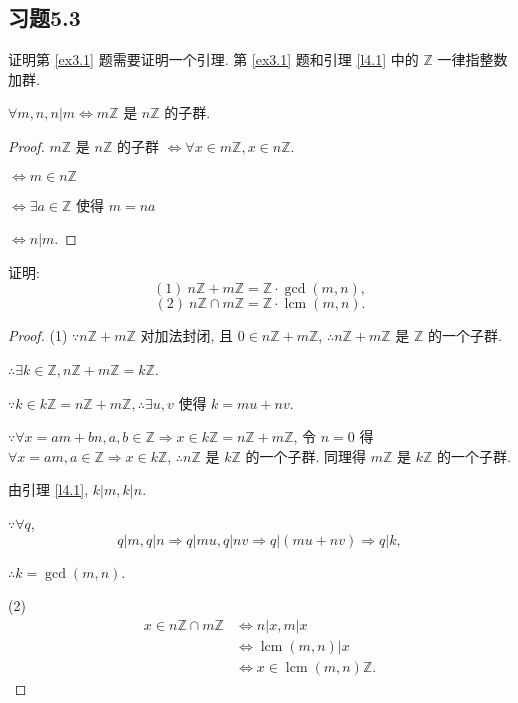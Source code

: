 \documentclass[UTF8]{ctexart}
\begin{document}
\subsection{习题5.3}
证明第 \ref{ex3.1} 题需要证明一个引理. 第 \ref{ex3.1} 题和引理 \ref{l4.1} 中的 $\mathbb{Z}$ 一律指整数加群.
\begin{lemma}\label{l4.1}
    $\forall m,n,n|m\Leftrightarrow m\mathbb{Z}$ 是 $n\mathbb{Z}$ 的子群.
\end{lemma}
\begin{proof}
    $m\mathbb{Z}$ 是 $n\mathbb{Z}$ 的子群 $\Leftrightarrow\forall x\in m\mathbb{Z},x\in n\mathbb{Z}$.

    $\Leftrightarrow m\in n\mathbb{Z}$

    $\Leftrightarrow\exists a\in\mathbb{Z}$ 使得 $m=na$

    $\Leftrightarrow n|m$.
\end{proof}
\begin{exercise}\label{ex3.1}
    证明:
    \[(1)\ n\mathbb{Z}+m\mathbb{Z}=\mathbb{Z}\cdot\gcd(m,n),\]
    \[(2)\ n\mathbb{Z}\cap m\mathbb{Z}=\mathbb{Z}\cdot\operatorname{lcm}(m,n).\]
\end{exercise}
\begin{proof}
    (1) $\because n\mathbb{Z}+m\mathbb{Z}$ 对加法封闭, 且 $0\in n\mathbb{Z}+m\mathbb{Z}$, $\therefore n\mathbb{Z}+m\mathbb{Z}$ 是 $\mathbb{Z}$ 的一个子群.
    
    $\therefore\exists k\in\mathbb{Z},n\mathbb{Z}+m\mathbb{Z}=k\mathbb{Z}$.

    $\because k\in k\mathbb{Z}=n\mathbb{Z}+m\mathbb{Z},\therefore\exists u,v$ 使得 $k=mu+nv$.

    $\because\forall x=am+bn,a,b\in\mathbb{Z}\Rightarrow x\in k\mathbb{Z}=n\mathbb{Z}+m\mathbb{Z}$, 令 $n=0$ 得 $\forall x=am,a\in\mathbb{Z}\Rightarrow x\in k\mathbb{Z}$, $\therefore n\mathbb{Z}$ 是 $k\mathbb{Z}$ 的一个子群. 同理得 $m\mathbb{Z}$ 是 $k\mathbb{Z}$ 的一个子群.

    由引理 \ref{l4.1}, $k|m,k|n$.

    $\because\forall q$,
    \[q|m,q|n\Rightarrow q|mu,q|nv\Rightarrow q|(mu+nv)\Rightarrow q|k,\]

    $\therefore k=\gcd(m,n)$.

    (2)
    \begin{align*}
        x\in n\mathbb{Z}\cap m\mathbb{Z} & \Leftrightarrow n|x,m|x \\
        & \Leftrightarrow\operatorname{lcm}(m,n)|x \\
        & \Leftrightarrow x\in\operatorname{lcm}(m,n)\mathbb{Z}.
    \end{align*}
\end{proof}
\end{document}
